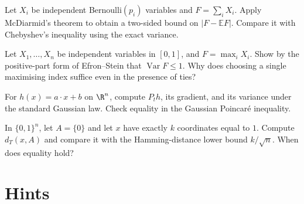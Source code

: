 \begin{exercise}[$\star$]\label{ex:v11-ch08-coins}
Let $X_i$ be independent Bernoulli$(p_i)$ variables and $F=\sum_iX_i$. Apply McDiarmid's theorem to obtain a two-sided bound on $|F-\mathbb EF|$. Compare it with Chebyshev's inequality using the exact variance.
\end{exercise}

\begin{exercise}[$\star\star$]\label{ex:v11-ch08-max}
Let $X_1,\dots,X_n$ be independent variables in $[0,1]$, and $F=\max_iX_i$. Show by the positive-part form of Efron--Stein that $\operatorname{Var}F\le1$. Why does choosing a single maximising index suffice even in the presence of ties?
\end{exercise}

\begin{exercise}[$\star\star$]\label{ex:v11-ch08-ou-linear}
For $h(x)=a\cdot x+b$ on $\R^n$, compute $P_th$, its gradient, and its variance under the standard Gaussian law. Check equality in the Gaussian Poincar\'e inequality.
\end{exercise}

\begin{exercise}[$\star\star$]\label{ex:v11-ch08-cube-distance}
In $\{0,1\}^n$, let $A=\{0\}$ and let $x$ have exactly $k$ coordinates equal to $1$. Compute $d_T(x,A)$ and compare it with the Hamming-distance lower bound $k/\sqrt n$. When does equality hold?
\end{exercise}

\section{Hints}

